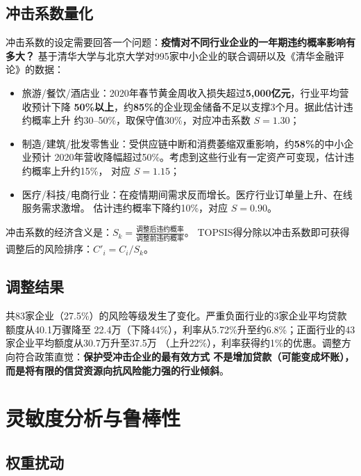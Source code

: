 \documentclass[12pt,a4paper]{ctexart}
\begin{document}
\subsection{冲击系数量化}

冲击系数的设定需要回答一个问题：\textbf{疫情对不同行业企业的一年期违约概率影响有多大？}
基于清华大学与北京大学对995家中小企业的联合调研以及《清华金融评论》的数据\cite{ref_covid_liu}：

\begin{itemize}
    \item 旅游/餐饮/酒店业：2020年春节黄金周收入损失超过\textbf{5,000亿元}，行业平均营收预计下降
          \textbf{50\%以上}，约\textbf{85\%}的企业现金储备不足以支撑3个月。据此估计违约概率上升
          约30--50\%，取保守值30\%，对应冲击系数 $S=1.30$；
    \item 制造/建筑/批发零售业：受供应链中断和消费萎缩双重影响，约\textbf{58\%}的中小企业预计
          2020年营收降幅超过50\%。考虑到这些行业有一定资产可变现，估计违约概率上升约15\%，
          对应 $S=1.15$；
    \item 医疗/科技/电商行业：在疫情期间需求反而增长。医疗行业订单量上升、在线服务需求激增。
          估计违约概率下降约10\%，对应 $S=0.90$。
\end{itemize}

冲击系数的经济含义是：$S_k = \frac{\text{调整后违约概率}}{\text{调整前违约概率}}$。
TOPSIS得分除以冲击系数即可获得调整后的风险排序：$C'_i = C_i / S_k$。

\subsection{调整结果}

共83家企业（27.5\%）的风险等级发生了变化。严重负面行业的3家企业平均贷款额度从40.1万骤降至
22.4万（下降44\%），利率从5.72\%升至约6.8\%；正面行业的43家企业平均额度从30.7万升至37.5万
（上升22\%），利率获得约1\%的优惠。调整方向符合政策直觉：\textbf{保护受冲击企业的最有效方式
不是增加贷款（可能变成坏账），而是将有限的信贷资源向抗风险能力强的行业倾斜}。

\section{灵敏度分析与鲁棒性}

\subsection{权重扰动}
\end{document}
